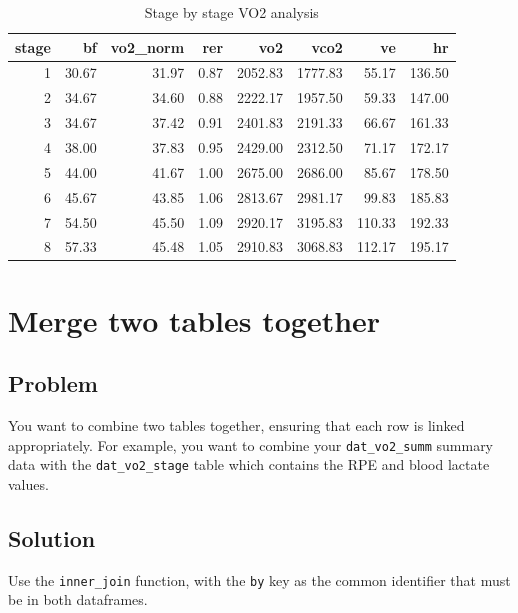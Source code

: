 \documentclass[
]{book}
\begin{document}
\begin{table}

\caption{\label{tab:unnamed-chunk-119}Stage by stage VO2 analysis}
\centering
\begin{tabular}[t]{r|r|r|r|r|r|r|r}
\hline
stage & bf & vo2\_norm & rer & vo2 & vco2 & ve & hr\\
\hline
1 & 30.67 & 31.97 & 0.87 & 2052.83 & 1777.83 & 55.17 & 136.50\\
\hline
2 & 34.67 & 34.60 & 0.88 & 2222.17 & 1957.50 & 59.33 & 147.00\\
\hline
3 & 34.67 & 37.42 & 0.91 & 2401.83 & 2191.33 & 66.67 & 161.33\\
\hline
4 & 38.00 & 37.83 & 0.95 & 2429.00 & 2312.50 & 71.17 & 172.17\\
\hline
5 & 44.00 & 41.67 & 1.00 & 2675.00 & 2686.00 & 85.67 & 178.50\\
\hline
6 & 45.67 & 43.85 & 1.06 & 2813.67 & 2981.17 & 99.83 & 185.83\\
\hline
7 & 54.50 & 45.50 & 1.09 & 2920.17 & 3195.83 & 110.33 & 192.33\\
\hline
8 & 57.33 & 45.48 & 1.05 & 2910.83 & 3068.83 & 112.17 & 195.17\\
\hline
\end{tabular}
\end{table}

\hypertarget{WRANGLE-INNER-JOIN}{%
\section{Merge two tables together}\label{WRANGLE-INNER-JOIN}}

\hypertarget{problem-14}{%
\subsection{Problem}\label{problem-14}}

You want to combine two tables together, ensuring that each row is linked appropriately. For example, you want to combine your \texttt{dat\_vo2\_summ} summary data with the \texttt{dat\_vo2\_stage} table which contains the RPE and blood lactate values.

\hypertarget{solution-14}{%
\subsection{Solution}\label{solution-14}}

Use the \texttt{inner\_join} function, with the \texttt{by} key as the common identifier that must be in both dataframes.
\end{document}
